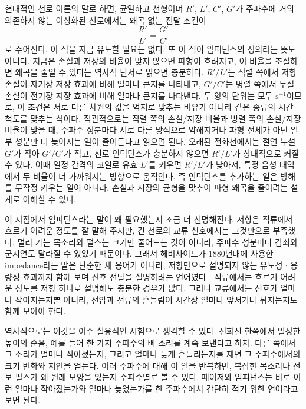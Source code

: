 현대적인 선로 이론의 말로 하면, 균일하고 선형이며 $R'$, $L'$, $C'$, $G'$가 주파수에 거의 의존하지 않는 이상화된 선로에서는 왜곡 없는 전달 조건이
\begin{equation}
  \frac{R'}{L'} = \frac{G'}{C'}
\end{equation}
로 주어진다.
이 식을 지금 유도할 필요는 없다.
또 이 식이 임피던스의 정의라는 뜻도 아니다.
지금은 손실과 저장의 비율이 맞지 않으면 파형이 흐려지고, 이 비율을 조절하면 왜곡을 줄일 수 있다는 역사적 단서로 읽으면 충분하다.
$R'/L'$는 직렬 쪽에서 저항 손실이 자기장 저장 효과에 비해 얼마나 큰지를 나타내고, $G'/C'$는 병렬 쪽에서 누설 손실이 전기장 저장 효과에 비해 얼마나 큰지를 나타낸다.
두 양의 단위는 모두 $\mathrm{s}^{-1}$이므로, 이 조건은 서로 다른 차원의 값을 억지로 맞추는 비유가 아니라 같은 종류의 시간 척도를 맞추는 식이다.
직관적으로는 직렬 쪽의 손실/저장 비율과 병렬 쪽의 손실/저장 비율이 맞을 때, 주파수 성분마다 서로 다른 방식으로 약해지거나 파형 전체가 아닌 일부 성분만 더 늦어지는 일이 줄어든다고 읽으면 된다.
오래된 전화선에서는 절연 누설 $G'$가 작아 $G'/C'$가 작고, 선로 인덕턴스가 충분하지 않으면 $R'/L'$가 상대적으로 커질 수 있다.
이때 일정 간격의 코일로 유효 $L'$를 키우면 $R'/L'$가 낮아져, 특정 음성 대역에서 두 비율이 더 가까워지는 방향으로 움직인다.
즉 인덕턴스를 추가하는 일은 방해를 무작정 키우는 일이 아니라, 손실과 저장의 균형을 맞추어 파형 왜곡을 줄이려는 설계로 이해할 수 있다.

이 지점에서 임피던스라는 말이 왜 필요했는지 조금 더 선명해진다.
저항은 직류에서 흐르기 어려운 정도를 잘 말해 주지만, 긴 선로의 교류 신호에서는 그것만으로 부족했다.
멀리 가는 목소리와 펄스는 크기만 줄어드는 것이 아니라, 주파수 성분마다 감쇠와 군지연도 달라질 수 있었기 때문이다.
그래서 헤비사이드가 1880년대에 사용한 impedance라는 말은 단순한 새 용어가 아니라, 저항만으로 설명되지 않는 유도성ㆍ용량성 효과까지 함께 보며 신호 전달을 설명하려는 언어였다 \cite{ptb_impedance_history,heaviside_electrical_papers,donaghyspargo2018heaviside}.
직류에서는 흐르기 어려운 정도를 저항 하나로 설명해도 충분한 경우가 많다.
그러나 교류에서는 신호가 얼마나 작아지는지뿐 아니라, 전압과 전류의 흔들림이 시간상 얼마나 앞서거나 뒤지는지도 함께 보아야 한다.

역사적으로는 이것을 아주 실용적인 시험으로 생각할 수 있다.
전화선 한쪽에서 일정한 높이의 순음, 예를 들어 한 가지 주파수의 삐 소리를 계속 보낸다고 하자.
다른 쪽에서 그 소리가 얼마나 작아졌는지, 그리고 얼마나 늦게 흔들리는지를 재면 그 주파수에서의 크기 변화와 지연을 얻는다.
여러 주파수에 대해 이 일을 반복하면, 복잡한 목소리나 전보 펄스가 왜 원래 모양을 잃는지 주파수별로 볼 수 있다.
페이저와 임피던스는 바로 이런 얼마나 작아졌는가와 얼마나 늦었는가를 한 주파수에서 간단히 적기 위한 언어라고 보면 된다.

